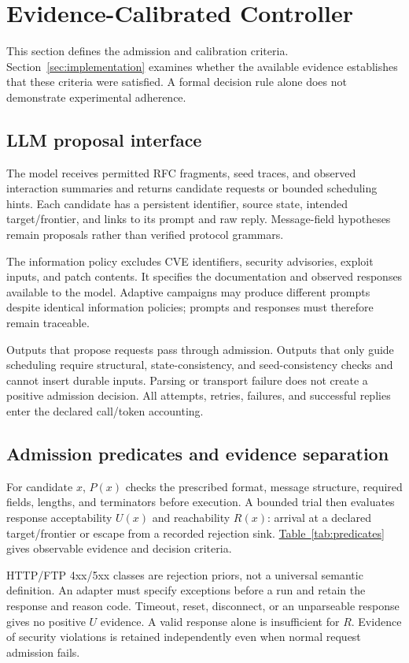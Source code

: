 \documentclass[final,5p,times,number]{elsarticle}
\newcommand{\namedref}[2]{\hyperref[#2]{#1~\ref*{#2}}}
\begin{document}
\section{Evidence-Calibrated Controller}
\label{sec:design}
This section defines the admission and calibration criteria. Section~\ref{sec:implementation} examines whether the available evidence establishes that these criteria were satisfied. A formal decision rule alone does not demonstrate experimental adherence.

\subsection{LLM proposal interface}
The model receives permitted RFC fragments, seed traces, and observed interaction summaries and returns candidate requests or bounded scheduling hints. Each candidate has a persistent identifier, source state, intended target/frontier, and links to its prompt and raw reply. Message-field hypotheses remain proposals rather than verified protocol grammars.

The information policy excludes CVE identifiers, security advisories, exploit inputs, and patch contents. It specifies the documentation and observed responses available to the model. Adaptive campaigns may produce different prompts despite identical information policies; prompts and responses must therefore remain traceable.

Outputs that propose requests pass through admission. Outputs that only guide scheduling require structural, state-consistency, and seed-consistency checks and cannot insert durable inputs. Parsing or transport failure does not create a positive admission decision. All attempts, retries, failures, and successful replies enter the declared call/token accounting.

\subsection{Admission predicates and evidence separation}
For candidate $x$, $P(x)$ checks the prescribed format, message structure, required fields, lengths, and terminators before execution. A bounded trial then evaluates response acceptability $U(x)$ and reachability $R(x)$: arrival at a declared target/frontier or escape from a recorded rejection sink. \namedref{Table}{tab:predicates} gives observable evidence and decision criteria.

HTTP/FTP 4xx/5xx classes are rejection priors, not a universal semantic definition. An adapter must specify exceptions before a run and retain the response and reason code. Timeout, reset, disconnect, or an unparseable response gives no positive $U$ evidence. A valid response alone is insufficient for $R$. Evidence of security violations is retained independently even when normal request admission fails.
\end{document}
